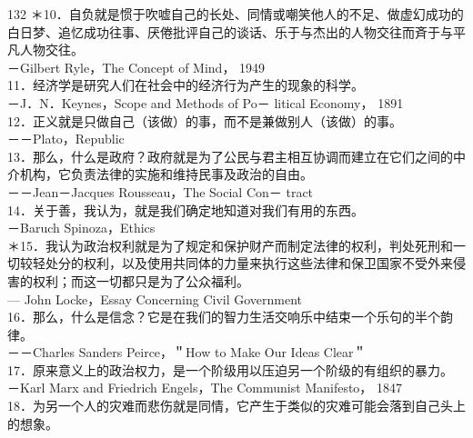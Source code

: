 132 ＊10．自负就是惯于吹嘘自己的长处、同情或嘲笑他人的不足、做虚幻成功的白日梦、追忆成功往事、厌倦批评自己的谈话、乐于与杰出的人物交往而斉于与平凡人物交往。\\
－Gilbert Ryle，The Concept of Mind， 1949\\
11．经济学是研究人们在社会中的经济行为产生的现象的科学。\\
－J．N．Keynes，Scope and Methods of Po－ litical Economy， 1891\\
12．正义就是只做自己（该做）的事，而不是兼做别人（该做）的事。\\
－－Plato，Republic\\
13．那么，什么是政府？政府就是为了公民与君主相互协调而建立在它们之间的中介机构，它负责法律的实施和维持民事及政治的自由。\\
－－Jean－Jacques Rousseau，The Social Con－ tract\\
14．关于善，我认为，就是我们确定地知道对我们有用的东西。\\
－Baruch Spinoza，Ethics\\
＊15．我认为政治权利就是为了规定和保护财产而制定法律的权利，判处死刑和一切较轻处分的权利，以及使用共同体的力量来执行这些法律和保卫国家不受外来侵害的权利；而这一切都只是为了公众福利。\\
— John Locke，Essay Concerning Civil Government\\
16．那么，什么是信念？它是在我们的智力生活交响乐中结束一个乐句的半个韵律。\\
－－Charles Sanders Peirce，＂How to Make Our Ideas Clear＂\\
17．原来意义上的政治权力，是一个阶级用以压迫另一个阶级的有组织的暴力。\\
－Karl Marx and Friedrich Engels，The Communist Manifesto， 1847\\
18．为另一个人的灾难而悲伤就是同情，它产生于类似的灾难可能会落到自己头上的想象。

